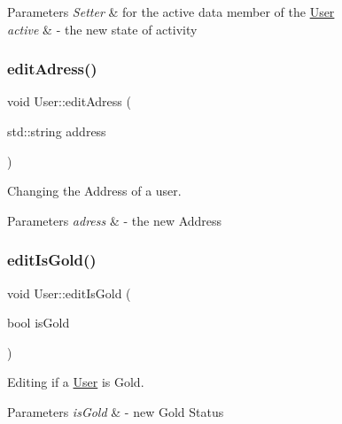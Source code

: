 \begin{DoxyParams}{Parameters}
{\em Setter} & for the active data member of the \mbox{\hyperlink{class_user}{User}} \\
\hline
{\em active} & -\/ the new state of activity \\
\hline
\end{DoxyParams}
\mbox{\label{class_user_a9d826d552e81ecc17828be848e02519b}} 
\subsubsection{\texorpdfstring{edit\+Adress()}{editAdress()}}
{\footnotesize\ttfamily void User\+::edit\+Adress (\begin{DoxyParamCaption}\item[{std\+::string}]{address }\end{DoxyParamCaption})}



Changing the Address of a user. 


\begin{DoxyParams}{Parameters}
{\em adress} & -\/ the new Address \\
\hline
\end{DoxyParams}
\mbox{\label{class_user_a092c80f086767a8c204320b6517bfc58}} 
\subsubsection{\texorpdfstring{edit\+Is\+Gold()}{editIsGold()}}
{\footnotesize\ttfamily void User\+::edit\+Is\+Gold (\begin{DoxyParamCaption}\item[{bool}]{is\+Gold }\end{DoxyParamCaption})}



Editing if a \mbox{\hyperlink{class_user}{User}} is Gold. 


\begin{DoxyParams}{Parameters}
{\em is\+Gold} & -\/ new Gold Status \\
\hline
\end{DoxyParams}
\mbox{\label{class_user_a470738d77c8d53ab5c41cdcd74497a82}} 
